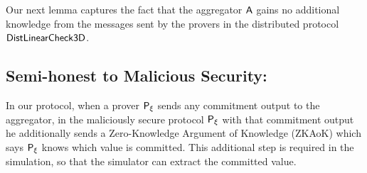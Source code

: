 \begin{comment}
\item Oracle Answers: The oracle responds with columns $\pi[\cdot,k]$ for $k\in
Q$.
\item $\verifier$ checks: The verifier checks $\sum_{i\in
[p]}r_i\pi[i,k]=\sum_{i\in [\ell]}\mc{T}[i,k]\tilde{c}_i$ for $k\in Q$.
\item $\verifier$ accepts if the above check succeeds and $b=1$. 
\end{enumerate}
\end{itemize}
\end{framed}
\caption{Distributed 3D Proximity Protocol}
\label{fig:distprox3d}
\end{figure}
\end{comment} 

Our next lemma captures the fact that the aggregator $\mathsf{A}$ gains no additional
knowledge from the messages sent by the provers in the distributed protocol
$\mathsf{DistLinearCheck3D}$. 

\subsection{Semi-honest to Malicious Security: }\label{sec:semi-honesttomalicious} In our protocol, when a prover $\mathsf{P}_\xi$ sends any commitment output to the aggregator, in the maliciously secure protocol $\mathsf{P}_\xi$ with that commitment output he additionally sends a Zero-Knowledge Argument of Knowledge (ZKAoK) which says $\mathsf{P}_\xi$ knows which value is committed. This additional step is required in the simulation, so that the simulator can extract the committed value.


